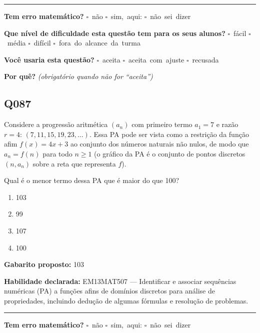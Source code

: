 \documentclass[11pt,a4paper]{article}
\begin{document}
\noindent\rule{\linewidth}{0.4pt}
\textbf{Tem erro matemático?}\quad
\mbox{$\square$~não} \quad \mbox{$\square$~sim, aqui:} \underline{\hspace{5cm}}
\quad \mbox{$\square$~não sei dizer}

\textbf{Que nível de dificuldade esta questão tem para os seus alunos?}\quad
\mbox{$\square$~fácil} \quad \mbox{$\square$~média} \quad
\mbox{$\square$~difícil} \quad \mbox{$\square$~fora do alcance da turma}

\textbf{Você usaria esta questão?}\quad
\mbox{$\square$~aceita} \quad \mbox{$\square$~aceita com ajuste} \quad
\mbox{$\square$~recusada}

\textbf{Por quê?} \emph{(obrigatório quando não for ``aceita'')}

\underline{\hspace{\linewidth}}

\underline{\hspace{\linewidth}}
\vspace{0.6em}

\begin{samepage}
\subsection*{Q087}
Considere a progressão aritmética $(a_n)$ com primeiro termo $a_1 = 7$ e razão $r = 4$: $(7, 11, 15, 19, 23, \dots)$. Essa PA pode ser vista como a restrição da função afim $f(x) = 4x + 3$ ao conjunto dos números naturais não nulos, de modo que $a_n = f(n)$ para todo $n \geq 1$ (o gráfico da PA é o conjunto de pontos discretos $(n, a_n)$ sobre a reta que representa $f$).

Qual é o menor termo dessa PA que é maior do que 100?
\begin{enumerate}[label=(\alph*),nosep,leftmargin=*]
\item 103
\item 99
\item 107
\item 100
\end{enumerate}

\textbf{Gabarito proposto:} 103

\textbf{Habilidade declarada:} EM13MAT507 --- Identificar e associar sequências numéricas (PA) a funções afins de domínios discretos para análise de propriedades, incluindo dedução de algumas fórmulas e resolução de problemas.
\end{samepage}

\noindent\rule{\linewidth}{0.4pt}
\textbf{Tem erro matemático?}\quad
\mbox{$\square$~não} \quad \mbox{$\square$~sim, aqui:} \underline{\hspace{5cm}}
\quad \mbox{$\square$~não sei dizer}
\end{document}

